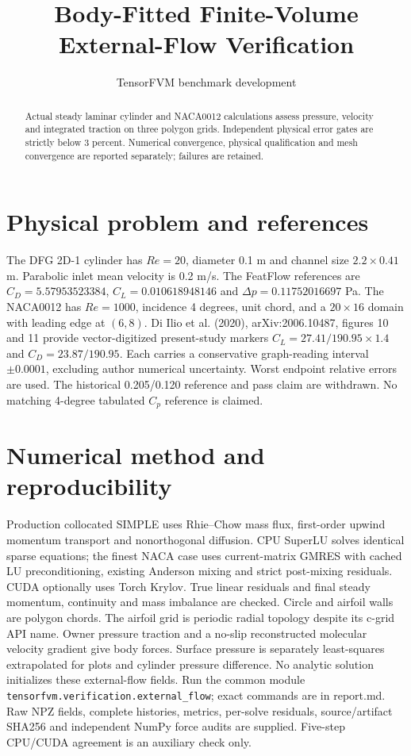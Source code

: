 \documentclass[11pt]{article}
\title{Body-Fitted Finite-Volume External-Flow Verification}
\author{TensorFVM benchmark development}
\begin{document}
\maketitle
\begin{abstract}
Actual steady laminar cylinder and NACA0012 calculations assess pressure, velocity and integrated traction on three polygon grids. Independent physical error gates are strictly below 3 percent. Numerical convergence, physical qualification and mesh convergence are reported separately; failures are retained.
\end{abstract}
\section{Physical problem and references}
The DFG 2D-1 cylinder has $Re=20$, diameter 0.1 m and channel size $2.2\times0.41$ m. Parabolic inlet mean velocity is 0.2 m/s. The FeatFlow references are $C_D=5.57953523384$, $C_L=0.010618948146$ and $\Delta p=0.11752016697$ Pa.
The NACA0012 has $Re=1000$, incidence 4 degrees, unit chord, and a $20\times16$ domain with leading edge at $(6,8)$.
Di Ilio et al. (2020), arXiv:2006.10487, figures 10 and 11 provide vector-digitized present-study markers $C_L=27.41/190.95\times1.4$ and $C_D=23.87/190.95$. Each carries a conservative graph-reading interval $\pm0.0001$, excluding author numerical uncertainty. Worst endpoint relative errors are used. The historical 0.205/0.120 reference and pass claim are withdrawn. No matching 4-degree tabulated $C_p$ reference is claimed.
\section{Numerical method and reproducibility}
Production collocated SIMPLE uses Rhie--Chow mass flux, first-order upwind momentum transport and nonorthogonal diffusion. CPU SuperLU solves identical sparse equations; the finest NACA case uses current-matrix GMRES with cached LU preconditioning, existing Anderson mixing and strict post-mixing residuals. CUDA optionally uses Torch Krylov. True linear residuals and final steady momentum, continuity and mass imbalance are checked. Circle and airfoil walls are polygon chords. The airfoil grid is periodic radial topology despite its c-grid API name. Owner pressure traction and a no-slip reconstructed molecular velocity gradient give body forces. Surface pressure is separately least-squares extrapolated for plots and cylinder pressure difference. No analytic solution initializes these external-flow fields.
Run the common module \texttt{tensorfvm.verification.external\_flow}; exact commands are in report.md. Raw NPZ fields, complete histories, metrics, per-solve residuals, source/artifact SHA256 and independent NumPy force audits are supplied. Five-step CPU/CUDA agreement is an auxiliary check only.
\end{document}
